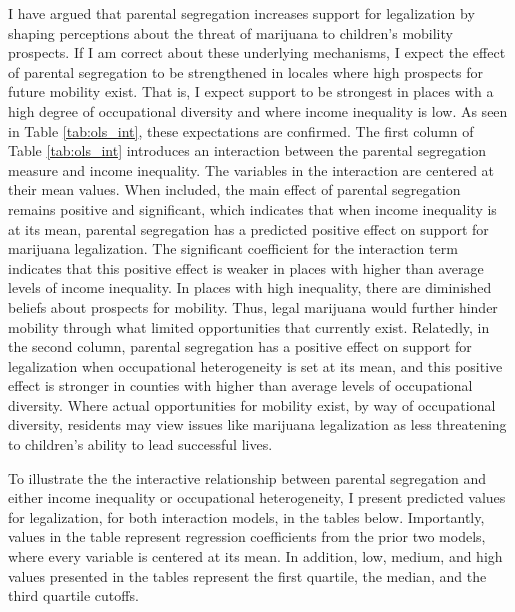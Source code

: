 I have argued that parental segregation increases support for legalization by shaping perceptions about the threat of marijuana to children's mobility prospects. If I am correct about these underlying mechanisms, I expect the effect of parental segregation to be strengthened in locales where high prospects for future mobility exist. That is, I expect support to be strongest in places with a high degree of occupational diversity and where income inequality is low. As seen in Table \ref{tab:ols_int}, these expectations are confirmed. The first column of Table \ref{tab:ols_int} introduces an interaction between the parental segregation measure and income inequality. The variables in the interaction are centered at their mean values. When included, the main effect of parental segregation remains positive and significant, which indicates that when income inequality is at its mean, parental segregation has a predicted positive effect on support for marijuana legalization. The significant coefficient for the interaction term indicates that this positive effect is weaker in places with higher than average levels of income inequality. In places with high inequality, there are diminished beliefs about prospects for mobility. Thus, legal marijuana would further hinder mobility through what limited opportunities that currently exist. Relatedly, in the second column, parental segregation has a positive effect on support for legalization when occupational heterogeneity is set at its mean, and this positive effect is stronger in counties with higher than average levels of occupational diversity. Where actual opportunities for mobility exist, by way of occupational diversity, residents may view issues like marijuana legalization as less threatening to children's ability to lead successful lives.

\begin{center}
%

\end{center}


To illustrate the the interactive relationship between parental segregation and either income inequality or occupational heterogeneity, I present predicted values for legalization, for both interaction models, in the tables below. Importantly, values in the table represent regression coefficients from the prior two models, where every variable is centered at its mean. In addition, low, medium, and high values presented in the tables represent the first quartile, the median, and the third quartile cutoffs. 


